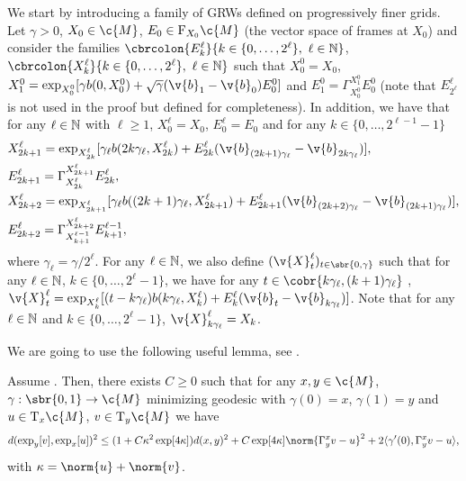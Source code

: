 We start by introducing a family of GRWs defined on progressively finer grids.
Let $\gamma >0$, $X_0 \in \c{M}$, $E_0 \in \mathrm{F}_{X_0} \c{M}$ (the vector space of frames at $X_0$) and consider the families $\cbrcolon{E_k^\ell}{k \in \{0, \dots, 2^\ell\}, \ \ell \in \N}$, $\cbrcolon{X_k^\ell}{k \in \{0, \dots, 2^\ell\}, \ \ell \in \N}$ such that $X_0^0 = X_0$, $X_1^0 = \exp_{X_0^0}[\gamma b(0, X_0^0) + \sqrt{\gamma} (\v{b}_1 - \v{b}_0) E_0^0]$ and $E_1^0 = \Gamma_{X_0^0}^{X_1^0} E_0^0$ (note that $E_{2^\ell}^\ell$ is not used in the proof but defined for completeness).
In addition, we have that for any $\ell \in \mathbb{N}$ with $\ell \geq 1$, $X_0^\ell = X_0$, $E_0^\ell = E_0$ and for any $k \in \{0, \dots, 2^{\ell-1}-1\}$ \begin{align} &X_{2k+1}^{\ell} = \exp_{X_{2k}^\ell}[\gamma_\ell b(2k \gamma_\ell, X_{2k}^\ell) + E_{2k}^\ell(\v{b}_{(2k+1)\gamma_\ell} - \v{b}_{2k \gamma_\ell}) ] , \\ &E_{2k+1}^\ell = \Gamma_{X_{2k}^\ell}^{X_{2k+1}^\ell} E_{2k}^\ell , \\ &X_{2k+2}^{\ell} = \exp_{X_{2k+1}^\ell}[\gamma_\ell b((2k+1) \gamma_\ell, X_{2k+1}^\ell) + E_{2k+1}^\ell (\v{b}_{(2k+2)\gamma_\ell} - \v{b}_{(2k+1) \gamma_\ell}) ] , \\ &E_{2k+2}^\ell = \Gamma_{X_{k+1}^{\ell-1}}^{X_{2k+2}^\ell} E_{k+1}^{\ell-1} , \label{eq:coupling} \end{align} where $\gamma_\ell = \gamma / 2^\ell$.
For any $\ell \in \mathbb{N}$, we also define $(\v{X}_t^\ell)_{t \in \sbr{0, \gamma}}$ such that for any $\ell \in \mathbb{N}$, $k \in \{0, \dots, 2^{\ell}-1\}$, we have for any $t \in \cobr{k \gamma_\ell, (k+1) \gamma_\ell}$ , $\v{X}_{t}^\ell = \exp_{X_{k}^\ell}[(t - k\gamma_\ell) b(k \gamma_\ell, X_{k}^\ell) + E_{k}^\ell (\v{b}_{t} - \v{b}_{k \gamma_\ell}) ]$.
Note that for any $\ell \in \mathbb{N}$ and $k \in \{0, \dots, 2^\ell -1\}$, $\v{X}_{k \gamma_\ell}^\ell = X_k$.

We are going to use the following useful lemma, see \cite[Lemma 62]{cheng2022theorymanifold}.
\begin{lemma}
	\label{lemma:bound_exp}
	Assume .
	Then, there exists $C \geq 0$ such that for any $x, y \in \c{M}$, $\gamma: \sbr{0,1} \to \c{M}$ minimizing geodesic with $\gamma(0) = x$, $\gamma(1) = y$ and $u \in \mathrm{T}_x \c{M}$, $v \in \mathrm{T}_y \c{M}$ we have \begin{equation} d(\exp_y[v], \exp_x[u])^2 \leq (1 +C \kappa^2 \exp[4 \kappa]) d(x,y)^2 + C \exp[4 \kappa] \norm{\Gamma_y^x v - u}^2 + 2 \langle \gamma'(0), \Gamma_y^x v - u \rangle , \end{equation} with $\kappa = \norm{u} + \norm{v}$.
\end{lemma}

